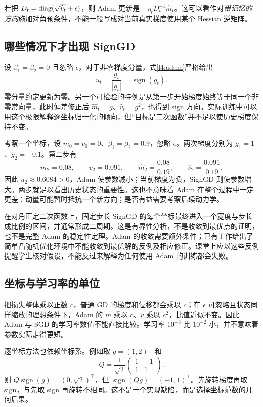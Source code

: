 若把 $D_t=\operatorname{diag}(\sqrt{\widehat v_t}+\epsilon)$，则 Adam 更新是
$-\eta_tD_t^{-1}\widehat m_t$。这可以看作对\emph{带记忆的方向}施加对角预条件，不能一般写成对当前真实梯度使用某个 Hessian 逆矩阵。

\subsection{哪些情况下才出现 SignGD}

设 $\beta_1=\beta_2=0$ 且忽略 $\epsilon$，对于非零梯度分量，式\eqref{l4:adam}严格给出
\[
 u_t=\frac{g_t}{|g_t|}=\operatorname{sign}(g_t).
\]
零分量约定更新为零。另一个可检验的特例是从第一步开始梯度始终等于同一个非零常向量，此时偏差修正后 $\widehat m_t=g$、$\widehat v_t=g^2$，也得到 sign 方向。实际训练中可以用这个极限解释逐坐标归一化的倾向，但“目标是二次函数”并不足以使历史梯度保持不变。

\begin{example}
考察一个坐标，设 $m_0=v_0=0$、$\beta_1=\beta_2=0.9$，忽略 $\epsilon$。两次梯度分别为 $g_1=1$、$g_2=-0.1$。第二步有
\[
 m_2=0.08,\qquad v_2=0.091,
 \qquad\widehat m_2=\frac{0.08}{0.19},
 \qquad\widehat v_2=\frac{0.091}{0.19}.
\]
因此 $u_2\approx0.6084>0$，Adam 使参数减小；当前梯度为负，SignGD 则使参数增大。两步就足以看出历史状态的重要性。这也不意味着 Adam 在整个过程中一定更差：动量可能暂时抵抗一个新方向；是否有益需要考察后续动力学。
\end{example}

在对角正定二次函数上，固定步长 SignGD 的每个坐标最终进入一个宽度与步长成比例的区间，并通常形成二周期。这是有界性分析，不是收敛到最优点的证明，也不是完整 Adam 的稳定性定理。Adam 的收敛需要额外条件；已有工作给出了简单凸随机优化环境中不能收敛到最优解的反例及相应修正\citep{Reddi2018}。课堂上应以这些反例提醒学生核对假设，不能反过来解释为任何使用 Adam 的训练都会失败。

\subsection{坐标与学习率的单位}

把损失整体乘以正数 $c$，普通 GD 的梯度和位移都会乘以 $c$；在 $\epsilon$ 可忽略且状态同样缩放的理想条件下，Adam 的 $m$ 乘以 $c$、$v$ 乘以 $c^2$，比值近似不变。因此 Adam 与 SGD 的学习率数值不能直接比较。学习率 $10^{-3}$ 比 $10^{-2}$ 小，并不意味着参数实际走得更短。

逐坐标方法也依赖坐标系。例如取 $g=(1,2)^\top$ 和
\[
 Q=\frac1{\sqrt2}
 \begin{pmatrix}1&-1\\1&1\end{pmatrix}.
\]
则 $Q\operatorname{sign}(g)=(0,\sqrt2)^\top$，但
$\operatorname{sign}(Qg)=(-1,1)^\top$。先旋转梯度再取 sign，与先取 sign 再旋转不相同。这不是一个实现缺陷，而是选择坐标范数的几何后果。

